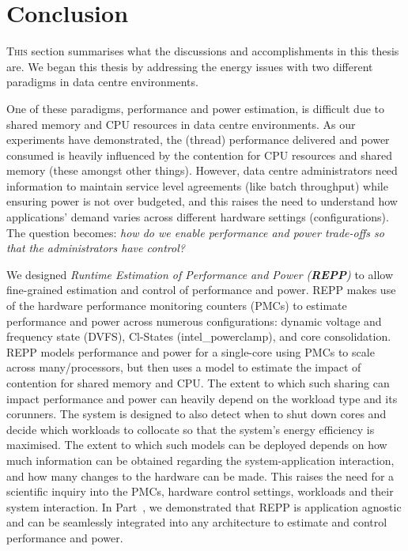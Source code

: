 \chapter{Conclusion} 
\label{chap: finalconc}

\lettrine{T}{his} section summarises what the discussions and accomplishments in this
thesis are.  We began this thesis by addressing the energy issues with two different
paradigms in data centre environments.

One of these paradigms, performance and power estimation, is difficult due to shared
memory and CPU resources in data centre environments.  As our experiments have
demonstrated, the (thread) performance delivered and power consumed is heavily influenced
by the contention for CPU resources and shared memory (these amongst other things).
However, data centre administrators need information to maintain service level agreements
(like batch throughput) while ensuring power is not over budgeted, and this raises the
need to understand how applications' demand varies across different hardware settings
(configurations). The question becomes: \emph{how do we enable performance and power
trade-offs so that the administrators have control?}

We designed \emph{Runtime Estimation of Performance and Power (\textbf{REPP})} to allow
fine-grained estimation and control of performance and power. REPP makes use of the
hardware performance monitoring counters (PMCs) to estimate performance and power across
numerous configurations: dynamic voltage and frequency state (DVFS), Cl-States
(intel\_{powerclamp}), and core consolidation. REPP models performance and power for a
single-core using PMCs to scale across many/\muc processors, but then uses a model to
estimate the impact of contention for shared memory and CPU. The extent to which such
sharing can impact performance and power can heavily depend on the workload type and its
corunners. The system is designed to also detect when to shut down cores and decide which
workloads to collocate so that the system's energy efficiency is maximised.  The extent to
which such models can be deployed depends on how much information can be obtained
regarding the system-application interaction, and how many changes to the hardware can be
made.  This raises the need for a scientific inquiry into the PMCs, hardware control
settings, workloads and their system interaction. In Part~, we demonstrated that
REPP is application agnostic and can be seamlessly integrated into any \muc architecture
to estimate and control performance and power. 

